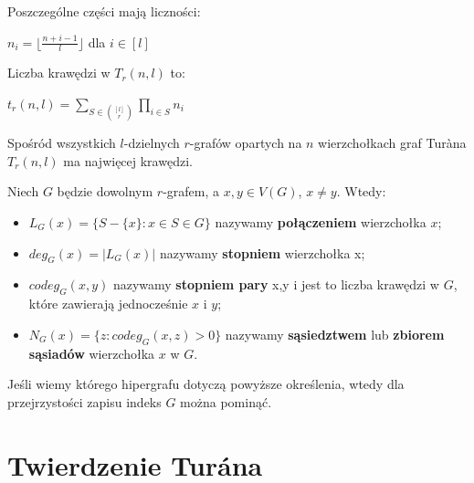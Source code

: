 \documentclass[miz,woman]{mgrwms}
\begin{document}
Poszczególne części mają liczności:
\begin{center}
 $n_i=\lfloor \frac{n+i-1}{l}\rfloor$ dla $i \in [l]$
\end{center}
Liczba krawędzi w $T_r(n,l)$ to:
\begin{center}
 $t_r(n,l)=\sum \limits_{S \in {[l] \choose r}} \prod \limits_{i \in S} n_i$
\end{center}
Spośród wszystkich $l$-dzielnych $r$-grafów opartych na $n$ wierzchołkach graf Tur\`{a}na $T_r(n,l)$ ma najwięcej krawędzi.\\
\begin{defi}
 Niech $G$ będzie dowolnym $r$-grafem, a $x,y\in V(G)$, $x \not =y$. Wtedy:\\
\begin{itemize}
 \item$L_G(x)=\{S-\{x\} : x \in S\in G\}$ nazywamy \textbf{połączeniem} wierzchołka $x$;\\
 \item$deg_G(x)=|L_G(x)|$ nazywamy \textbf{stopniem} wierzchołka x;\\
 \item$codeg_G(x,y)$ nazywamy \textbf{stopniem pary} x,y i jest to liczba krawędzi w $G$, które zawierają jednocześnie $x$ i $y$;\\
 \item$N_G(x)=\{z:codeg_G(x,z)>0\}$ nazywamy \textbf{sąsiedztwem} lub \textbf{zbiorem sąsiadów} wierzchołka $x$ w $G$.
\end{itemize}
\end{defi}
Jeśli wiemy którego hipergrafu dotyczą powyższe określenia, wtedy dla przejrzystości zapisu indeks $G$ można pominąć.
\section{Twierdzenie Tur\'ana}
\end{document}
